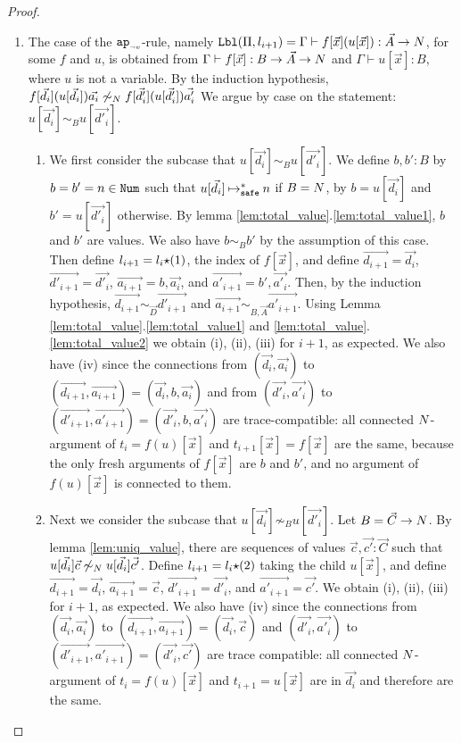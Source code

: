 \begin{proof}
\begin{enumerate}
  \item
    The case of the ${{\tt ap}_{\mbox{\tiny $\neg v$}}}$-rule, namely 
    ${\tt Lbl}(\Pi,l_{i+1}) = \Gamma\vdash f[\vec{x}](u[\vec{x}]): \vec{A}\rightarrow{N}$,
    for some $f$ and $u$, 
    is obtained from $\Gamma\vdash f[\vec{x}]: B \rightarrow \vec{A}\rightarrow{N}$ 
    and $\Gamma\vdash u[\vec{x}]: B$, where $u$ is not a variable.
    By the induction hypothesis,
    $f[\vec{d_i}](u[\vec{d_i}])\vec{a_i} \not\sim_{N} f[\vec{d'_i}](u[\vec{d'_i}])\vec{a'_i}$
    We argue by case on the statement: \emph{$u[\vec{d_i}] \sim_B u[\vec{d'_i}]$}.

    \begin{enumerate}
    \item
      We first consider the subcase that \emph{$u[\vec{d_i}] \sim_B u[\vec{d'_i}]$}.
      We define $b,b':B$ by $b = b' = n\in{\tt Num}$ such that $u[\vec{d_i}] \mathbin{\mathbin{\mapsto}_{\hbox{\scriptsize \tt safe}}^*} n$ if $B={N}$,
      by $b = u[\vec{d_i}]$ and $b' = u[\vec{d'_i}]$ otherwise.
      By lemma \ref{lem:total_value}.\ref{lem:total_value1}, $b$ and $b'$ are values.
      We also have $b \sim_B b'$ by the assumption of this case.
      Then define $l_{i+1}=l_i{\star}(1)$, the index of $f[\vec{x}]$,
      and define $\vec{d_{i+1}} = \vec{d_i}$, $\vec{d'_{i+1}} = \vec{d'_i}$,
      $\vec{a_{i+1}} = b,\vec{a_i}$, and $\vec{a'_{i+1}} = b',\vec{a'_i}$.
      Then, by the induction hypothesis, $\vec{d_{i+1}} \sim_{\vec{D}} \vec{d'_{i+1}}$ and
      $\vec{a_{i+1}} \sim_{B,\vec{A}} \vec{a'_{i+1}}$. 
      Using Lemma \ref{lem:total_value}.\ref{lem:total_value1} and \ref{lem:total_value}.\ref{lem:total_value2}
      we obtain (i), (ii), (iii) for $i+1$, as expected. 
      We also have (iv) since the connections 
      from $(\vec{d_i},\vec{a_i})$ to $(\vec{d_{i+1}},\vec{a_{i+1}}) = (\vec{d_i},b,\vec{a_i})$
      and
      from $(\vec{d'_i},\vec{a'_i})$ to $(\vec{d'_{i+1}},\vec{a'_{i+1}}) = (\vec{d'_i},b,\vec{a'_i})$
      are trace-compatible: all connected 
      ${N}$-argument of $t_i=f(u)[\vec{x}]$ and $t_{i+1}[\vec{x}] = f[\vec{x}]$ are the same,
      because the only fresh arguments of $f[\vec{x}]$ 
      are $b$ and $b'$, and no argument of $f(u)[\vec{x}]$ is connected to them.
    \item
      Next we consider the subcase that \emph{$u[\vec{d_i}] \not\sim_B u[\vec{d'_i}]$}.
      Let $B = \vec{C}\rightarrow{N}$. 
      By lemma \ref{lem:uniq_value},
      there are sequences of values $\vec{c}, \vec{c'}:\vec{C}$ such that
      $u[\vec{d_i}]\vec{c} \not\sim_{N} u[\vec{d_i}]\vec{c'}$. 
      Define $l_{i+1}= l_i {\star} (2)$ taking the child $u[\vec{x}]$,
      and define $\vec{d_{i+1}} = \vec{d_i}$, $\vec{a_{i+1}} = \vec{c}$, 
      $\vec{d'_{i+1}} = \vec{d'_i}$, and $\vec{a'_{i+1}} = \vec{c'}$. 
      We obtain (i), (ii), (iii) for $i+1$, as expected.
      We also have (iv) since the connections from 
      $(\vec{d_i},\vec{a_i})$ to $(\vec{d_{i+1}},\vec{a_{i+1}}) = (\vec{d_i},\vec{c})$
      and
      $(\vec{d'_i},\vec{a'_i})$ to $(\vec{d'_{i+1}},\vec{a'_{i+1}}) = (\vec{d'_i},\vec{c'})$
      are trace compatible: all connected ${N}$-argument of $t_{i}=f(u)[\vec{x}]$ and $t_{i+1}=u[\vec{x}]$ are 
      in $\vec{d_i}$ and therefore are the same.
    \end{enumerate}


\end{enumerate}
\end{proof}
